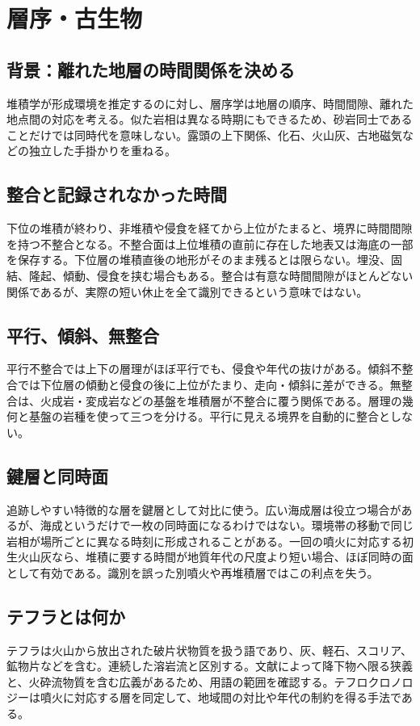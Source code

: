 \chapter{層序・古生物}
\section{背景：離れた地層の時間関係を決める}
\label{theory:stratigraphy:background}
堆積学が形成環境を推定するのに対し、層序学は地層の順序、時間間隙、離れた地点間の対応を考える。似た岩相は異なる時期にもできるため、砂岩同士であることだけでは同時代を意味しない。露頭の上下関係、化石、火山灰、古地磁気などの独立した手掛かりを重ねる。

\section{整合と記録されなかった時間}
\label{theory:stratigraphy:hiatus}
下位の堆積が終わり、非堆積や侵食を経てから上位がたまると、境界に時間間隙を持つ不整合となる。不整合面は上位堆積の直前に存在した地表又は海底の一部を保存する。下位層の堆積直後の地形がそのまま残るとは限らない。埋没、固結、隆起、傾動、侵食を挟む場合もある。整合は有意な時間間隙がほとんどない関係であるが、実際の短い休止を全て識別できるという意味ではない。\cite{strat_iu_unconformity}

\section{平行、傾斜、無整合}
\label{theory:stratigraphy:unconformity}
平行不整合では上下の層理がほぼ平行でも、侵食や年代の抜けがある。傾斜不整合では下位層の傾動と侵食の後に上位がたまり、走向・傾斜に差ができる。無整合は、火成岩・変成岩などの基盤を堆積層が不整合に覆う関係である。層理の幾何と基盤の岩種を使って三つを分ける。平行に見える境界を自動的に整合としない。\cite{strat_iu_unconformity}

\section{鍵層と同時面}
\label{theory:stratigraphy:marker}
追跡しやすい特徴的な層を鍵層として対比に使う。広い海成層は役立つ場合があるが、海成というだけで一枚の同時面になるわけではない。環境帯の移動で同じ岩相が場所ごとに異なる時刻に形成されることがある。一回の噴火に対応する初生火山灰なら、堆積に要する時間が地質年代の尺度より短い場合、ほぼ同時の面として有効である。識別を誤った別噴火や再堆積層ではこの利点を失う。

\section{テフラとは何か}
\label{theory:stratigraphy:tephra}
テフラは火山から放出された破片状物質を扱う語であり、灰、軽石、スコリア、鉱物片などを含む。連続した溶岩流と区別する。文献によって降下物へ限る狭義と、火砕流物質を含む広義があるため、用語の範囲を確認する。テフロクロノロジーは噴火に対応する層を同定して、地域間の対比や年代の制約を得る手法である。\cite{volc_usgs_tephra}

